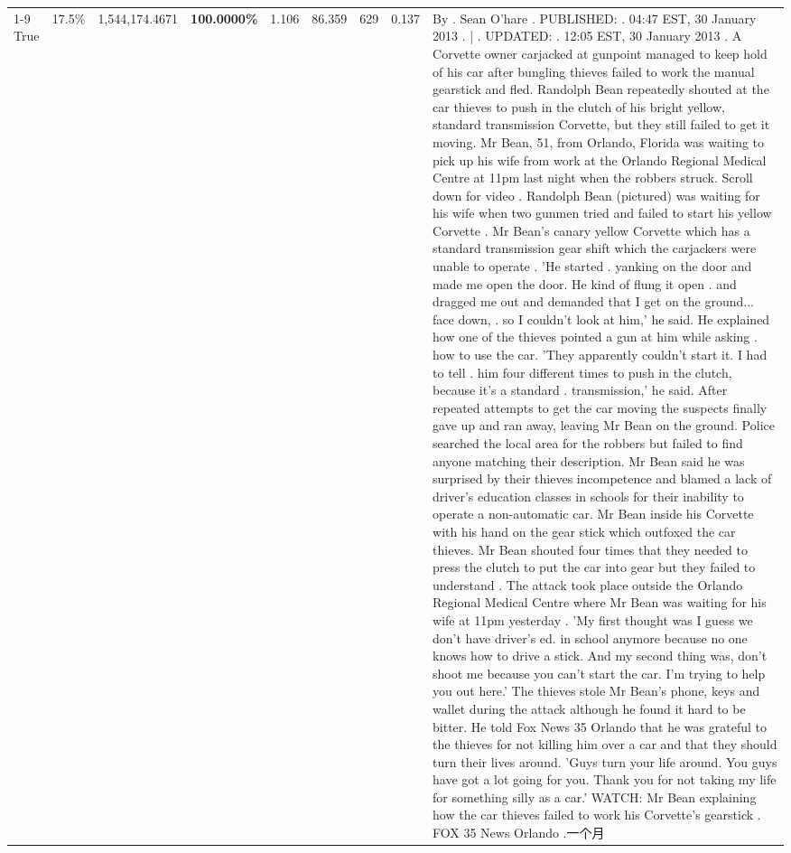 \begin{table}[H]
\begin{tabular}{lllrlllll}
\cline{1-9} \cline{2-9}
True & 17.5\% & 1,544,174.4671 & \bfseries \color{red} 100.0000\% & 1.106 & 86.359 & 629 & 0.137 & By . Sean O'hare . PUBLISHED: . 04:47 EST, 30 January 2013 . | . UPDATED: . 12:05 EST, 30 January 2013 . A Corvette owner carjacked at gunpoint managed to keep hold of his car after bungling thieves failed to work the manual gearstick and fled. Randolph Bean repeatedly shouted at the car thieves to push in the clutch of his bright yellow, standard transmission Corvette, but they still failed to get it moving. Mr Bean, 51, from Orlando, Florida was waiting to pick up his wife from work at the Orlando Regional Medical Centre at 11pm last night when the robbers struck. Scroll down for video . Randolph Bean (pictured) was waiting for his wife when two gunmen tried and failed to start his yellow Corvette . Mr Bean's canary yellow Corvette which has a standard transmission gear shift which the carjackers were unable to operate . 'He started . yanking on the door and made me open the door. He kind of flung it open . and dragged me out and demanded that I get on the ground... face down, . so I couldn't look at him,' he said. He explained how one of the thieves pointed a gun at him while asking . how to use the car. 'They apparently couldn't start it. I had to tell . him four different times to push in the clutch, because it's a standard . transmission,' he said. After repeated attempts to get the car moving the suspects finally gave up and ran away, leaving Mr Bean on the ground. Police searched the local area for the robbers but failed to find anyone matching their description. Mr Bean said he was surprised by their thieves incompetence and blamed a lack of driver's education classes in schools for their inability to operate a non-automatic car. Mr Bean inside his Corvette with his hand on the gear stick which outfoxed the car thieves. Mr Bean shouted four times that they needed to press the clutch to put the car into gear but they failed to understand . The attack took place outside the Orlando Regional Medical Centre where Mr Bean was waiting for his wife at 11pm yesterday . 'My first thought was I guess we don't have driver's ed. in school anymore because no one knows how to drive a stick. And my second thing was, don't shoot me because you can't start the car. I'm trying to help you out here.' The thieves stole Mr Bean's phone, keys and wallet during the attack although he found it hard to be bitter. He told Fox News 35 Orlando that he was grateful to the thieves for not killing him over a car and that they should turn their lives around. 'Guys turn your life around. You guys have got a lot going for you. Thank you for not taking my life for something silly as a car.' WATCH: Mr Bean explaining how the car thieves failed to work his Corvette's gearstick . FOX 35 News Orlando .一个月 \\

\end{tabular}
\end{table}
